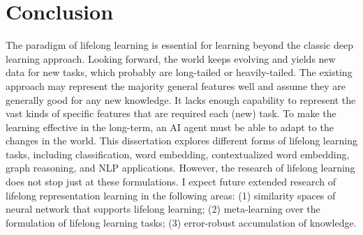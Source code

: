 \chapter{Conclusion}
The paradigm of lifelong learning is essential for learning beyond the classic deep learning approach.
Looking forward, the world keeps evolving and yields new data for new tasks, which probably are long-tailed or heavily-tailed.
The existing approach may represent the majority general features well and assume they are generally good for any new knowledge.
It lacks enough capability to represent the vast kinds of specific features that are required each (new) task.
To make the learning effective in the long-term, an AI agent must be able to adapt to the changes in the world.
This dissertation explores different forms of lifelong learning tasks, including classification, word embedding, contextualized word embedding, graph reasoning, and NLP applications.
However, the research of lifelong learning does not stop just at these formulations.
I expect future extended research of lifelong representation learning in the following areas: (1) similarity spaces of neural network that supports lifelong learning; (2) meta-learning over the formulation of lifelong learning tasks; (3) error-robust accumulation of knowledge.